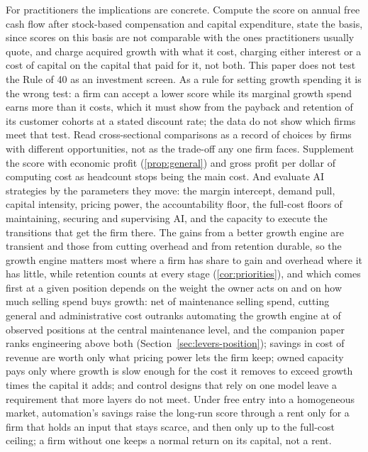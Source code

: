 For practitioners the implications are concrete. Compute the score on annual free cash flow after stock-based compensation and capital expenditure, state the basis, since scores on this basis are not comparable with the ones practitioners usually quote, and charge acquired growth with what it cost, charging either interest or a cost of capital on the capital that paid for it, not both. This paper does not test the Rule of 40 as an investment screen. As a rule for setting growth spending it is the wrong test: a firm can accept a lower score while its marginal growth spend earns more than it costs, which it must show from the payback and retention of its customer cohorts at a stated discount rate; the data do not show which firms meet that test. Read cross-sectional comparisons as a record of choices by firms with different opportunities, not as the trade-off any one firm faces. Supplement the score with economic profit (\autoref{prop:general}) and gross profit per dollar of computing cost as headcount stops being the main cost. And evaluate AI strategies by the parameters they move: the margin intercept, demand pull, capital intensity, pricing power, the accountability floor, the full-cost floors of maintaining, securing and supervising AI, and the capacity to execute the transitions that get the firm there. The gains from a better growth engine are transient and those from cutting overhead and from retention durable, so the growth engine matters most where a firm has share to gain and overhead where it has little, while retention counts at every stage (\autoref{cor:priorities}), and which comes first at a given position depends on the weight the owner acts on and on how much selling spend buys growth: net of maintenance selling spend, cutting general and administrative cost outranks automating the growth engine at \lpNGACutFirstNet{} of \lpNPositions{} observed positions at the central maintenance level, and the companion paper ranks engineering above both (Section~\ref{sec:levers-position}); savings in cost of revenue are worth only what pricing power lets the firm keep; owned capacity pays only where growth is slow enough for the cost it removes to exceed growth times the capital it adds; and control designs that rely on one model leave a requirement that more layers do not meet. Under free entry into a homogeneous market, automation's savings raise the long-run score through a rent only for a firm that holds an input that stays scarce, and then only up to the full-cost ceiling; a firm without one keeps a normal return on its capital, not a rent.
